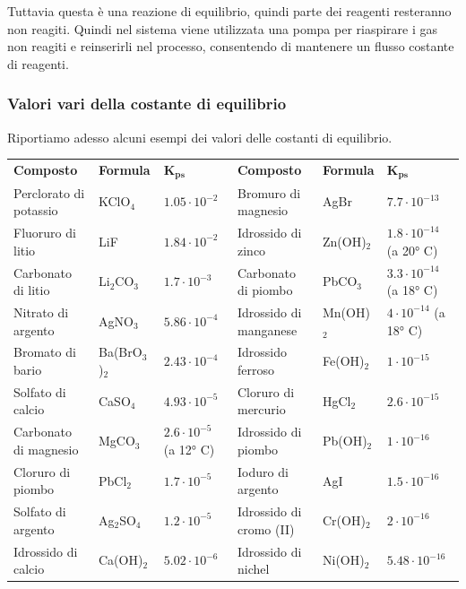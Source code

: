 Tuttavia questa è una reazione di equilibrio, quindi parte dei reagenti resteranno non reagiti. Quindi nel sistema viene utilizzata una pompa per riaspirare i gas non reagiti e reinserirli nel processo, consentendo di mantenere un flusso costante di reagenti.
\newpage
\subsubsection{Valori vari della costante di equilibrio}

Riportiamo adesso alcuni esempi dei valori delle costanti di equilibrio.

\vspace{0.5cm}\hspace{-0.5cm}\scriptsize\begin{tabular}{p{3.4cm}p{1.6cm}p{2.5cm}p{3.4cm}p{1.6cm}p{2.5cm}}
    \textbf{Composto} & \textbf{Formula} & $\boldsymbol{K_{ps}}$ & \textbf{Composto} & \textbf{Formula} & $\boldsymbol{K_{ps}}$\\[0.7ex]
    Perclorato di potassio & KClO$_4$ & $1.05 \cdot 10^{-2}$ & Bromuro di magnesio & AgBr & $7.7 \cdot 10^{-13}$\\[0.7ex]
    Fluoruro di litio & LiF & $1.84 \cdot 10^{-2}$ & Idrossido di zinco & Zn(OH)$_2$ & $1.8 \cdot 10^{-14}$ (a 20° C)\\[0.7ex]
    Carbonato di litio & Li$_2$CO$_3$ & $1.7 \cdot 10^{-3}$ & Carbonato di piombo & PbCO$_3$ & $3.3 \cdot 10^{-14}$ (a 18° C)\\[0.7ex]
    Nitrato di argento & AgNO$_3$ & $5.86 \cdot 10^{-4}$ & Idrossido di manganese & Mn(OH)$_2$ & $4 \cdot 10^{-14}$ (a 18° C)\\[0.7ex]
    Bromato di bario & Ba(BrO$_3$)$_2$ & $2.43 \cdot 10^{-4}$ & Idrossido ferroso & Fe(OH)$_2$ & $1 \cdot 10^{-15}$ \\[0.7ex]
    Solfato di calcio & CaSO$_4$ & $4.93 \cdot 10^{-5}$ & Cloruro di mercurio & HgCl$_2$ & $2.6 \cdot 10^{-15}$\\[0.7ex]
    Carbonato di magnesio & MgCO$_3$ & $2.6 \cdot 10^{-5}$ (a 12° C) & Idrossido di piombo & Pb(OH)$_2$ & $1 \cdot 10^{-16}$\\[0.7ex]
    Cloruro di piombo & PbCl$_2$ & $1.7 \cdot 10^{-5}$ & Ioduro di argento & AgI & $1.5 \cdot 10^{-16}$\\[0.7ex]
    Solfato di argento & Ag$_2$SO$_4$ & $1.2 \cdot 10^{-5}$ & Idrossido di cromo (II) & Cr(OH)$_2$ & $2 \cdot 10^{-16}$ \\[0.7ex]
    Idrossido di calcio & Ca(OH)$_2$ & $5.02 \cdot 10^{-6}$ & Idrossido di nichel & Ni(OH)$_2$ & $5.48 \cdot 10^{-16}$ \\[0.7ex]

\end{tabular}
